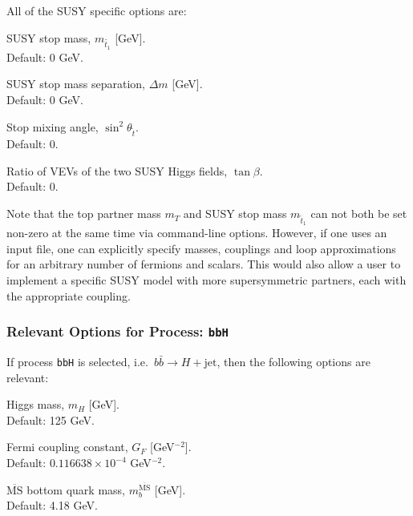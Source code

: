 \documentclass[12pt]{article}
\begin{document}
\noindent All of the SUSY specific options are: 
\begin{description}[labelindent=1cm, labelwidth =\widthof{\bfseries9999999999999999999999}, leftmargin = !] 
	\item[\texttt{-{}-mst <value>}] SUSY stop mass, $m_{\tilde{t_1}}$ [GeV]. \\ Default: 0 GeV. 
	\item[\texttt{-{}-delta <value>}] SUSY stop mass separation, $\Delta m$ [GeV]. \\ Default: 0 GeV. 
	\item[\texttt{-{}-sth2 <value>}] Stop mixing angle, $\sin^2 \theta_{\tilde{t}}$. \\ Default: 0. 
	\item[\texttt{-{}-tbeta <value>}] Ratio of VEVs of the two SUSY Higgs fields, $\tan\beta$. \\ Default: 0. 
\end{description}
Note that the top partner mass $m_{T}$ and SUSY stop mass
$m_{\tilde{t}_1}$ can not both be set non-zero at the same time via
command-line options. However, if one uses an input file, one can
explicitly specify masses, couplings and loop approximations for an
arbitrary number of fermions and scalars. This would also allow a user
to implement a specific SUSY model with more supersymmetric partners,
each with the appropriate coupling.

\subsubsection{Relevant Options for Process: \texttt{bbH}}
If process \texttt{bbH} is selected, i.e.\
$
	b\bar{b} \rightarrow H + \text{jet}
$, then the following options are relevant: 
\begin{description}[labelindent=1cm, labelwidth =\widthof{\bfseries9999999999999999999999}, leftmargin = !] 
	\item[\texttt{-{}-mH <value>}] Higgs mass, $m_H$ [GeV]. \\ Default: 125 GeV. 
	\item[\texttt{-{}-GF <value>}] Fermi coupling constant, $G_F$ [GeV$^{-2}$]. \\ Default: $0.116638 \times 10^{-4}$ GeV$^{-2}$. 
	\item[\texttt{-{}-mbmb <value>}] $\overline{\text{MS}}$ bottom quark mass, $m_b^{\overline{\text{MS}}}$ [GeV]. \\ Default: 4.18 GeV. 
\end{description}
\end{document}
